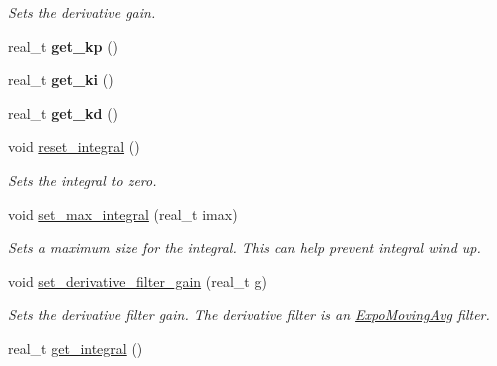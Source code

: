 \begin{DoxyCompactItemize}
\begin{DoxyCompactList}\small\item\em Sets the derivative gain. \end{DoxyCompactList}\item 
\hypertarget{classetk_1_1_p_i_d_controller_a438f51c529a8171b3c18d564461add26}{real\-\_\-t {\bfseries get\-\_\-kp} ()}\label{classetk_1_1_p_i_d_controller_a438f51c529a8171b3c18d564461add26}

\item 
\hypertarget{classetk_1_1_p_i_d_controller_af6d39b029c8ad621acbabf36425268dd}{real\-\_\-t {\bfseries get\-\_\-ki} ()}\label{classetk_1_1_p_i_d_controller_af6d39b029c8ad621acbabf36425268dd}

\item 
\hypertarget{classetk_1_1_p_i_d_controller_a69fd9c40b85ddba301a7acc5ba658255}{real\-\_\-t {\bfseries get\-\_\-kd} ()}\label{classetk_1_1_p_i_d_controller_a69fd9c40b85ddba301a7acc5ba658255}

\item 
\hypertarget{classetk_1_1_p_i_d_controller_a02af725f99fb1e0131674f7602fd635e}{void \hyperlink{classetk_1_1_p_i_d_controller_a02af725f99fb1e0131674f7602fd635e}{reset\-\_\-integral} ()}\label{classetk_1_1_p_i_d_controller_a02af725f99fb1e0131674f7602fd635e}

\begin{DoxyCompactList}\small\item\em Sets the integral to zero. \end{DoxyCompactList}\item 
\hypertarget{classetk_1_1_p_i_d_controller_a19b27067a3b56846245b8ca14919e98b}{void \hyperlink{classetk_1_1_p_i_d_controller_a19b27067a3b56846245b8ca14919e98b}{set\-\_\-max\-\_\-integral} (real\-\_\-t imax)}\label{classetk_1_1_p_i_d_controller_a19b27067a3b56846245b8ca14919e98b}

\begin{DoxyCompactList}\small\item\em Sets a maximum size for the integral. This can help prevent integral wind up. \end{DoxyCompactList}\item 
\hypertarget{classetk_1_1_p_i_d_controller_a023f411018741e4c1265284de78b5f53}{void \hyperlink{classetk_1_1_p_i_d_controller_a023f411018741e4c1265284de78b5f53}{set\-\_\-derivative\-\_\-filter\-\_\-gain} (real\-\_\-t g)}\label{classetk_1_1_p_i_d_controller_a023f411018741e4c1265284de78b5f53}

\begin{DoxyCompactList}\small\item\em Sets the derivative filter gain. The derivative filter is an \hyperlink{classetk_1_1_expo_moving_avg}{Expo\-Moving\-Avg} filter. \end{DoxyCompactList}\item 
\hypertarget{classetk_1_1_p_i_d_controller_a25ba04e64f94802a65bc464e3b364595}{real\-\_\-t \hyperlink{classetk_1_1_p_i_d_controller_a25ba04e64f94802a65bc464e3b364595}{get\-\_\-integral} ()}\label{classetk_1_1_p_i_d_controller_a25ba04e64f94802a65bc464e3b364595}


\end{DoxyCompactItemize}
